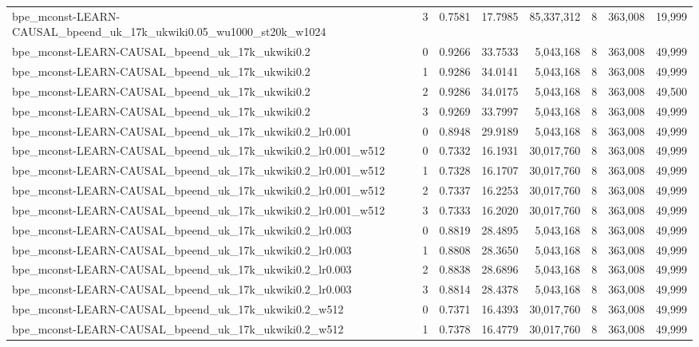 \begin{tabular}{lrrrrrrr}
bpe\_mconst-LEARN-CAUSAL\_bpeend\_uk\_17k\_ukwiki0.05\_wu1000\_st20k\_w1024 & 3 & 0.7581 & 17.7985 & 85,337,312 & 8 & 363,008 & 19,999 \\
bpe\_mconst-LEARN-CAUSAL\_bpeend\_uk\_17k\_ukwiki0.2 & 0 & 0.9266 & 33.7533 & 5,043,168 & 8 & 363,008 & 49,999 \\
bpe\_mconst-LEARN-CAUSAL\_bpeend\_uk\_17k\_ukwiki0.2 & 1 & 0.9286 & 34.0141 & 5,043,168 & 8 & 363,008 & 49,999 \\
bpe\_mconst-LEARN-CAUSAL\_bpeend\_uk\_17k\_ukwiki0.2 & 2 & 0.9286 & 34.0175 & 5,043,168 & 8 & 363,008 & 49,500 \\
bpe\_mconst-LEARN-CAUSAL\_bpeend\_uk\_17k\_ukwiki0.2 & 3 & 0.9269 & 33.7997 & 5,043,168 & 8 & 363,008 & 49,999 \\
bpe\_mconst-LEARN-CAUSAL\_bpeend\_uk\_17k\_ukwiki0.2\_lr0.001 & 0 & 0.8948 & 29.9189 & 5,043,168 & 8 & 363,008 & 49,999 \\
bpe\_mconst-LEARN-CAUSAL\_bpeend\_uk\_17k\_ukwiki0.2\_lr0.001\_w512 & 0 & 0.7332 & 16.1931 & 30,017,760 & 8 & 363,008 & 49,999 \\
bpe\_mconst-LEARN-CAUSAL\_bpeend\_uk\_17k\_ukwiki0.2\_lr0.001\_w512 & 1 & 0.7328 & 16.1707 & 30,017,760 & 8 & 363,008 & 49,999 \\
bpe\_mconst-LEARN-CAUSAL\_bpeend\_uk\_17k\_ukwiki0.2\_lr0.001\_w512 & 2 & 0.7337 & 16.2253 & 30,017,760 & 8 & 363,008 & 49,999 \\
bpe\_mconst-LEARN-CAUSAL\_bpeend\_uk\_17k\_ukwiki0.2\_lr0.001\_w512 & 3 & 0.7333 & 16.2020 & 30,017,760 & 8 & 363,008 & 49,999 \\
bpe\_mconst-LEARN-CAUSAL\_bpeend\_uk\_17k\_ukwiki0.2\_lr0.003 & 0 & 0.8819 & 28.4895 & 5,043,168 & 8 & 363,008 & 49,999 \\
bpe\_mconst-LEARN-CAUSAL\_bpeend\_uk\_17k\_ukwiki0.2\_lr0.003 & 1 & 0.8808 & 28.3650 & 5,043,168 & 8 & 363,008 & 49,999 \\
bpe\_mconst-LEARN-CAUSAL\_bpeend\_uk\_17k\_ukwiki0.2\_lr0.003 & 2 & 0.8838 & 28.6896 & 5,043,168 & 8 & 363,008 & 49,999 \\
bpe\_mconst-LEARN-CAUSAL\_bpeend\_uk\_17k\_ukwiki0.2\_lr0.003 & 3 & 0.8814 & 28.4378 & 5,043,168 & 8 & 363,008 & 49,999 \\
bpe\_mconst-LEARN-CAUSAL\_bpeend\_uk\_17k\_ukwiki0.2\_w512 & 0 & 0.7371 & 16.4393 & 30,017,760 & 8 & 363,008 & 49,999 \\
bpe\_mconst-LEARN-CAUSAL\_bpeend\_uk\_17k\_ukwiki0.2\_w512 & 1 & 0.7378 & 16.4779 & 30,017,760 & 8 & 363,008 & 49,999 \\

\end{tabular}
